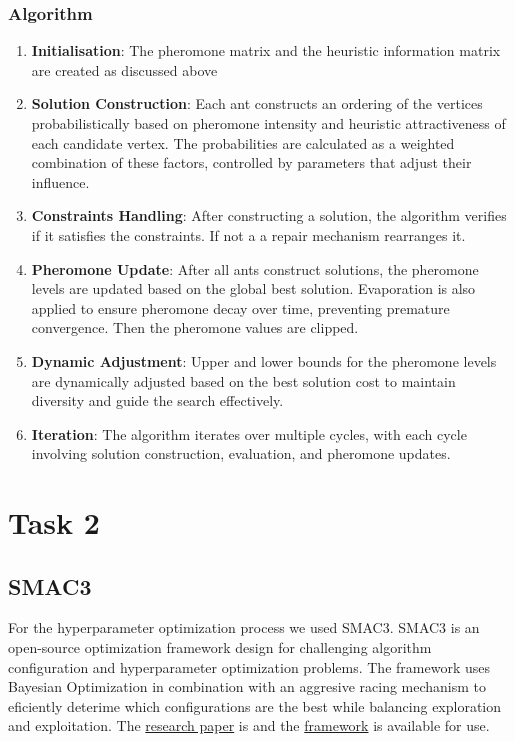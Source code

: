 \documentclass{article}
\begin{document}
\subsubsection*{Algorithm}
\begin{enumerate}
    \item \textbf{Initialisation}: The pheromone matrix and the heuristic information matrix are created as discussed above
    \item \textbf{Solution Construction}: Each ant constructs an ordering of the vertices probabilistically based on pheromone intensity and heuristic attractiveness of each candidate vertex. The probabilities are calculated as a weighted combination of these factors, controlled by parameters that adjust their influence.
    \item \textbf{Constraints Handling}: After constructing a solution, the algorithm verifies if it satisfies the constraints. If not a a repair mechanism rearranges it.
    \item \textbf{Pheromone Update}: After all ants construct solutions, the pheromone levels are updated based on the global best solution. Evaporation is also applied to ensure pheromone decay over time, preventing premature convergence. Then the pheromone values are clipped.
    \item \textbf{Dynamic Adjustment}: Upper and lower bounds for the pheromone levels are dynamically adjusted based on the best solution cost to maintain diversity and guide the search effectively.
    \item \textbf{Iteration}: The algorithm iterates over multiple cycles, with each cycle involving solution construction, evaluation, and pheromone updates.

\end{enumerate}

\section{Task 2}

\subsection{SMAC3}
For the hyperparameter optimization process we used SMAC3. SMAC3 is an open-source optimization framework design for challenging algorithm configuration and hyperparameter optimization problems.
The framework uses Bayesian Optimization in combination with an aggresive racing mechanism to eficiently deterime which configurations are the best while balancing exploration and exploitation.
The \href{https://jmlr.org/papers/v23/21-0888.html}{research paper} is and the \href{https://github.com/automl/SMAC3}{framework} is available for use.
\end{document}
